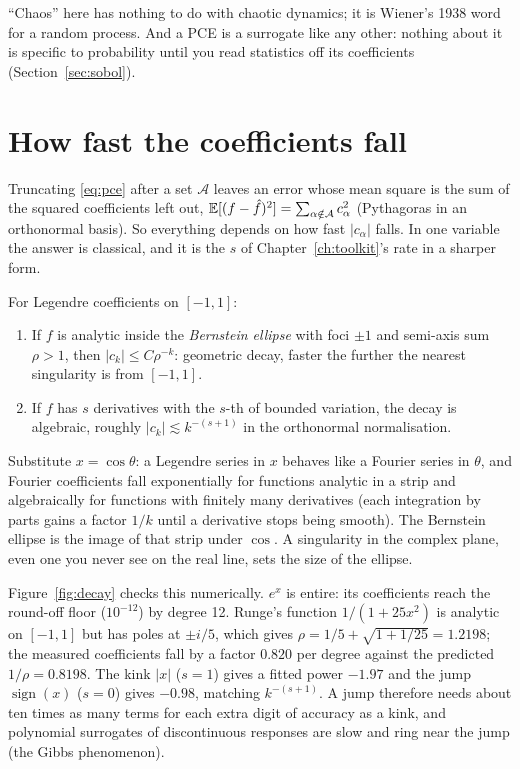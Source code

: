 \begin{pitfall}
``Chaos'' here has nothing to do with chaotic dynamics; it is Wiener's 1938 word for a random process. And a PCE is
a surrogate like any other: nothing about it is specific to probability until you read statistics off its
coefficients (Section~\ref{sec:sobol}).
\end{pitfall}

\section{How fast the coefficients fall}
\label{sec:decay}

Truncating \eqref{eq:pce} after a set $\mathcal{A}$ leaves an error whose mean square is the sum of the squared
coefficients left out, $\mathbb{E}[(f - \hat f)^2] = \sum_{\alpha \notin \mathcal{A}} c_\alpha^2$ (Pythagoras in an
orthonormal basis). So everything depends on how fast $|c_\alpha|$ falls. In one variable the answer is classical,
and it is the $s$ of Chapter~\ref{ch:toolkit}'s rate in a sharper form.

\begin{result}
\label{res:decay}
For Legendre coefficients on $[-1,1]$:
\begin{enumerate}[nosep]
  \item If $f$ is analytic inside the \emph{Bernstein ellipse} with foci $\pm1$ and semi-axis sum $\rho > 1$, then
        $|c_k| \le C \rho^{-k}$: geometric decay, faster the further the nearest singularity is from $[-1,1]$.
  \item If $f$ has $s$ derivatives with the $s$-th of bounded variation, the decay is algebraic, roughly
        $|c_k| \lesssim k^{-(s+1)}$ in the orthonormal normalisation.
\end{enumerate}
\end{result}
\begin{intuition}
Substitute $x = \cos\theta$: a Legendre series in $x$ behaves like a Fourier series in $\theta$, and Fourier
coefficients fall exponentially for functions analytic in a strip and algebraically for functions with finitely
many derivatives (each integration by parts gains a factor $1/k$ until a derivative stops being smooth). The
Bernstein ellipse is the image of that strip under $\cos$. A singularity in the complex plane, even one you never
see on the real line, sets the size of the ellipse.
\end{intuition}

Figure~\ref{fig:decay} checks this numerically. $e^{x}$ is entire: its coefficients reach the round-off floor
($10^{-12}$) by degree 12. Runge's function $1/(1+25x^2)$ is analytic on $[-1,1]$ but has poles at $\pm i/5$, which
gives $\rho = 1/5 + \sqrt{1 + 1/25} = 1.2198$; the measured coefficients fall by a factor $0.820$ per degree against
the predicted $1/\rho = 0.8198$. The kink $|x|$ ($s = 1$) gives a fitted power $-1.97$ and the jump
$\operatorname{sign}(x)$ ($s = 0$) gives $-0.98$, matching $k^{-(s+1)}$. A jump therefore needs about ten times as
many terms for each extra digit of accuracy as a kink, and polynomial surrogates of discontinuous responses are
slow and ring near the jump (the Gibbs phenomenon).

